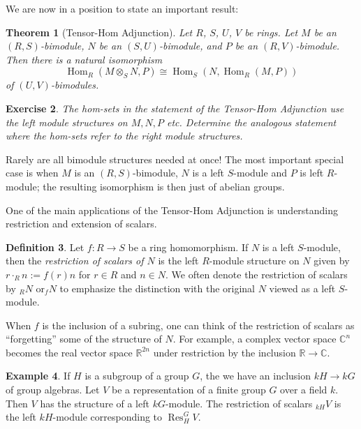 \documentclass[12pt]{article}
\theoremstyle{plain}
\newtheorem{theorem}{Theorem}[section]
\newtheorem{exercise}[theorem]{Exercise}
\theoremstyle{definition}
\newtheorem{definition}[theorem]{Definition}
\newtheorem{example}[theorem]{Example}
\theoremstyle{remark}
\numberwithin{equation}{section}
\begin{document}
We are now in a position to state an important result:

\begin{theorem}[Tensor-Hom Adjunction]
Let $R$, $S$, $U$, $V$ be rings.
Let $M$ be an $(R,S)$-bimodule, $N$ be an $(S,U)$-bimodule,
and $P$ be an $(R,V)$-bimodule.
Then there is a natural isomorphism
\[
\operatorname{Hom}_R(M \otimes_S N,P)
\cong \operatorname{Hom}_S(N,\operatorname{Hom}_R(M,P))
\]
 of $(U,V)$-bimodules.
\end{theorem}

\begin{exercise}
The hom-sets in the statement of the Tensor-Hom Adjunction
use the \emph{left} module structures on $M,N,P$ etc.
Determine the analogous statement where the hom-sets
refer to the \emph{right} module structures.
\end{exercise}

Rarely are all bimodule structures needed at once!
The most important special case is when $M$ is an $(R,S)$-bimodule,
$N$ is a left $S$-module and $P$ is left $R$-module;
the resulting isomorphism is then just of abelian groups.

One of the main applications of the Tensor-Hom Adjunction is
understanding restriction and extension of scalars.

\begin{definition}
Let $f : R \to S$ be a ring homomorphism.
If $N$ is a left $S$-module, then the \emph{restriction of scalars
of $N$} is the left $R$-module structure on $N$ given by
$r \cdot_R n := f(r)n$ for $r \in R$ and $n \in N$.
We often denote the restriction of scalars by ${}_RN$
or${}_fN$ to emphasize the distinction with the original $N$
viewed as a left $S$-module.
\end{definition} 

When $f$ is the inclusion of a subring, one can think of the restriction
of scalars as ``forgetting'' some of the structure of $N$.
For example, a complex vector space $\mathbb{C}^n$ becomes the real
vector space $\mathbb{R}^{2n}$ under restriction by the inclusion
$\mathbb{R} \to \mathbb{C}$.

\begin{example}
If $H$ is a subgroup of a group $G$, the we have an inclusion
$kH \to kG$ of group algebras.
Let $V$ be a representation of a finite group $G$ over a field $k$.
Then $V$ has the structure of a left $kG$-module.
The restriction of scalars ${}_{kH}V$ is the left $kH$-module
corresponding to $\operatorname{Res}_H^G V$. 
\end{example}
\end{document}
